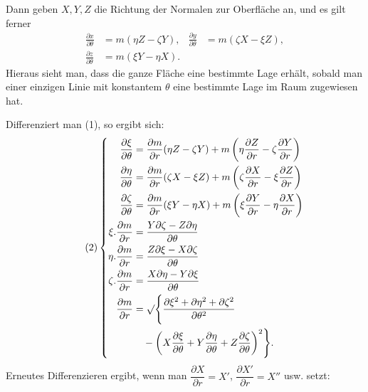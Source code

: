 %
\noindent Dann geben $X,Y,Z$ die Richtung der Normalen zur Oberfläche an, und es gilt ferner
\begin{equation}\tag{1}
\begin{aligned}
\frac{\partial x}{\partial\theta}&=m(\eta Z-\zeta Y),&\frac{\partial y}{\partial\theta}&=m(\zeta X-\xi Z),\\
\frac{\partial z}{\partial\theta}&=m(\xi Y-\eta X).
\end{aligned}
\end{equation}
\indent Hieraus sieht man, dass die ganze Fläche eine bestimmte Lage erhält, sobald man einer einzigen Linie mit konstantem $\theta$ eine bestimmte Lage im Raum zugewiesen hat.

Differenziert man (1), so ergibt sich:
\begin{equation}\tag{2}
\left\{\begin{aligned}
\frac{\partial\xi}{\partial\theta}&=\frac{\partial m}{\partial r}(\eta Z-\zeta Y)+m\left(\eta\frac{\partial Z}{\partial r}-\zeta\frac{\partial Y}{\partial r}\right)\\
\frac{\partial\eta}{\partial\theta}&=\frac{\partial m}{\partial r}(\zeta X-\xi Z)+m\left(\zeta\frac{\partial X}{\partial r}-\xi\frac{\partial Z}{\partial r}\right)\\
\frac{\partial\zeta}{\partial\theta}&=\frac{\partial m}{\partial r}(\xi Y-\eta X)+m\left(\xi\frac{\partial Y}{\partial r}-\eta\frac{\partial X}{\partial r}\right)\\
\xi.\frac{\partial m}{\partial r}&=\frac{Y\partial\zeta-Z\partial\eta}{\partial\theta}\\
\eta.\frac{\partial m}{\partial r}&=\frac{Z\partial\xi-X\partial\zeta}{\partial\theta}\\
\zeta.\frac{\partial m}{\partial r}&=\frac{X\partial\eta-Y\partial\xi}{\partial\theta}\\
\frac{\partial m}{\partial r}&=\mathord{\surd}\Biggl\{\frac{\partial\xi^2+\partial\eta^2+\partial\zeta^2}{\partial\theta^2}\\
&\quad-\left(X\frac{\partial\xi}{\partial\theta}+Y\frac{\partial\eta}{\partial\theta}+Z\frac{\partial\zeta}{\partial\theta}\right)^2\Biggr\}.
\end{aligned}\right.
\end{equation}
\indent Erneutes Differenzieren ergibt, wenn man $\dfrac{\partial X}{\partial r}=X'$, $\dfrac{\partial X'}{\partial r}=X''$ usw. setzt:
